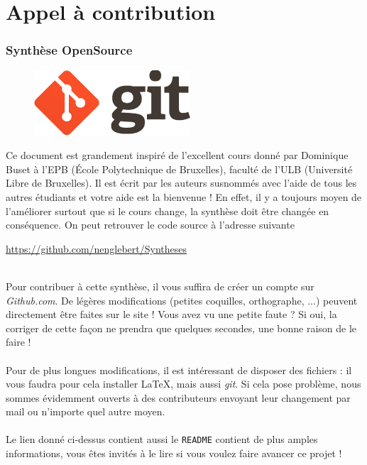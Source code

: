 \chapter*{Appel à contribution}
\subsection*{Synthèse OpenSource}
\begin{figure}
\includegraphics[scale=0.5]{git.png}
\end{figure}
Ce document est grandement inspiré de l’excellent cours donné 
par Dominique Buset à l’EPB (École Polytechnique de Bruxelles), faculté de l’ULB (Université 
Libre de Bruxelles). Il est écrit par les auteurs susnommés avec l’aide de tous les autres étudiants 
et votre aide est la bienvenue ! En effet, il y a toujours moyen de l’améliorer surtout que si le 
cours change, la synthèse doit être changée en conséquence. On peut retrouver le code source à l’adresse 
suivante
\begin{center}
\url{https://github.com/nenglebert/Syntheses}
\end{center}\ \\
Pour contribuer à cette synthèse, il vous suffira de créer un compte sur \textit{Github.com}. De
légères modifications (petites coquilles, orthographe, ...) peuvent directement être faites sur le
site ! Vous avez vu une petite faute ? Si oui, la corriger de cette façon ne prendra que quelques 
secondes, une bonne raison de le faire ! \\
\\
Pour de plus longues modifications, il est intéressant de disposer des fichiers : il vous 
faudra pour cela installer \LaTeX, mais aussi \textit{git}. Si cela pose problème, nous sommes 
évidemment ouverts à des contributeurs envoyant leur changement par mail ou n’importe quel autre 
moyen.\\
\\
Le lien donné ci-dessus contient aussi le \texttt{README} contient de plus amples informations, 
vous êtes invités à le lire si vous voulez faire avancer ce projet ! 

